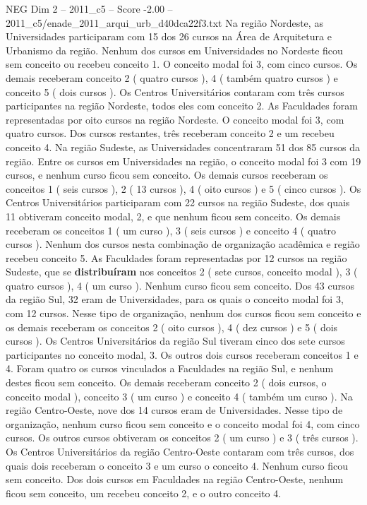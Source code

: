 \begin{textsample}{NEG Dim 2 – 2011\_c5 – Score -2.00 – 2011\_c5/enade\_2011\_arqui\_urb\_d40dca22f3.txt}
Na região Nordeste, as Universidades participaram com 15 dos 26 cursos na Área de Arquitetura e Urbanismo da região.
Nenhum dos cursos em Universidades no Nordeste ficou sem conceito ou recebeu conceito 1.
O conceito modal foi 3, com cinco cursos.
Os demais receberam conceito 2 ( quatro cursos ), 4 ( também quatro cursos ) e conceito 5 ( dois cursos ).
Os Centros Universitários contaram com três cursos participantes na região Nordeste, todos eles com conceito 2.
As Faculdades foram representadas por oito cursos na região Nordeste.
O conceito modal foi 3, com quatro cursos.
Dos cursos restantes, três receberam conceito 2 e um recebeu conceito 4.
Na região Sudeste, as Universidades concentraram 51 dos 85 cursos da região.
Entre os cursos em Universidades na região, o conceito modal foi 3 com 19 cursos, e nenhum curso ficou sem conceito.
Os demais cursos receberam os conceitos 1 ( seis cursos ), 2 ( 13 cursos ), 4 ( oito cursos ) e 5 ( cinco cursos ).
Os Centros Universitários participaram com 22 cursos na região Sudeste, dos quais 11 obtiveram conceito modal, 2, e que nenhum ficou sem conceito.
Os demais receberam os conceitos 1 ( um curso ), 3 ( seis cursos ) e conceito 4 ( quatro cursos ).
Nenhum dos cursos nesta combinação de organização acadêmica e região recebeu conceito 5.
As Faculdades foram representadas por 12 cursos na região Sudeste, que se \textbf{distribuíram} nos conceitos 2 ( sete cursos, conceito modal ), 3 ( quatro cursos ), 4 ( um curso ).
Nenhum curso ficou sem conceito.
Dos 43 cursos da região Sul, 32 eram de Universidades, para os quais o conceito modal foi 3, com 12 cursos.
Nesse tipo de organização, nenhum dos cursos ficou sem conceito e os demais receberam os conceitos 2 ( oito cursos ), 4 ( dez cursos ) e 5 ( dois cursos ).
Os Centros Universitários da região Sul tiveram cinco dos sete cursos participantes no conceito modal, 3.
Os outros dois cursos receberam conceitos 1 e 4.
Foram quatro os cursos vinculados a Faculdades na região Sul, e nenhum destes ficou sem conceito.
Os demais receberam conceito 2 ( dois cursos, o conceito modal ), conceito 3 ( um curso ) e conceito 4 ( também um curso ).
Na região Centro-Oeste, nove dos 14 cursos eram de Universidades.
Nesse tipo de organização, nenhum curso ficou sem conceito e o conceito modal foi 4, com cinco cursos.
Os outros cursos obtiveram os conceitos 2 ( um curso ) e 3 ( três cursos ).
Os Centros Universitários da região Centro-Oeste contaram com três cursos, dos quais dois receberam o conceito 3 e um curso o conceito 4.
Nenhum curso ficou sem conceito.
Dos dois cursos em Faculdades na região Centro-Oeste, nenhum ficou sem conceito, um recebeu conceito 2, e o outro conceito 4.

\end{textsample}
